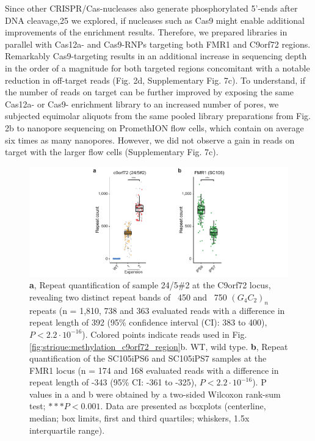 Since other CRISPR/Cas-nucleases also generate phosphorylated 5’-ends after DNA cleavage,25 we explored, if nucleases such as Cas9 might enable additional improvements of the enrichment results. Therefore, we prepared libraries in parallel with Cas12a- and Cas9-RNPs targeting both FMR1 and C9orf72 regions. Remarkably Cas9-targeting results in an additional increase in sequencing depth in the order of a magnitude for both targeted regions concomitant with a notable reduction in off-target reads (Fig. 2d, Supplementary Fig. 7c). To understand, if the number of reads on target can be further improved by exposing the same Cas12a- or Cas9- enrichment library to an increased number of pores, we subjected equimolar aliquots from the same pooled library preparations from Fig. 2b to nanopore sequencing on PromethION flow cells, which contain on average six times as many nanopores. However, we did not observe a gain in reads on target with the larger flow cells (Supplementary Fig. 7c).

\begin{figure}[h]
    \centering
    \includegraphics[width=1.0\textwidth]{figures/strique/count_patient_samples.pdf}
    \captionsetup{format=plain}
    \caption[Repeat quantification in c9orf72 and FMR1 patients]{\textbf{a}, Repeat quantification of sample 24/5\#2 at the C9orf72 locus, revealing two distinct repeat bands of ~450 and ~750 $ (G_{4}C_{2})_{n} $ repeats (n = 1,810, 738 and 363 evaluated reads with a difference in repeat length of 392 (95\% confidence interval (CI): 383 to 400), $ P < 2.2 \cdot 10^{-16} $). Colored points indicate reads used in Fig. \ref{fig:strique:methylation_c9orf72_region}b. WT, wild type. \textbf{b}, Repeat quantification of the SC105iPS6 and SC105iPS7 samples at the FMR1 locus (n = 174 and 168 evaluated reads with a difference in repeat length of -343 (95\% CI: -361 to -325), $ P < 2.2 \cdot 10^{-16} $). P values in a and b were obtained by a two-sided Wilcoxon rank-sum test; $ ***P < 0.001 $. Data are presented as boxplots (centerline, median; box limits, first and third quartiles; whiskers, 1.5x interquartile range).}
    \label{fig:strique:count_patients}
\end{figure}

